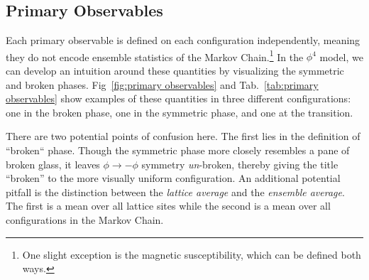 \documentclass[12pt]{report}
\begin{document}
\subsection{Primary Observables}
Each primary observable is defined on each configuration independently, meaning they do not encode ensemble statistics of the Markov Chain.\footnote{One slight exception is the magnetic susceptibility, which can be defined both ways.} In the $\phi^4$ model, we can develop an intuition around these quantities by visualizing the symmetric and broken phases. Fig~\ref{fig:primary observables} and Tab.~\ref{tab:primary observables} show examples of these quantities in three different configurations: one in the broken phase, one in the symmetric phase, and one at the transition. 

There are two potential points of confusion here. The first lies in the definition of ``broken`` phase. Though the symmetric phase more closely resembles a pane of broken glass, it leaves $\phi\rightarrow-\phi$ symmetry \textit{un}-broken, thereby giving the title ``broken'' to the more visually uniform configuration. An additional potential pitfall is the distinction between the \textit{lattice average} and the \textit{ensemble average}. The first is a mean over all lattice sites while the second is a mean over all configurations in the Markov Chain.
\end{document}
